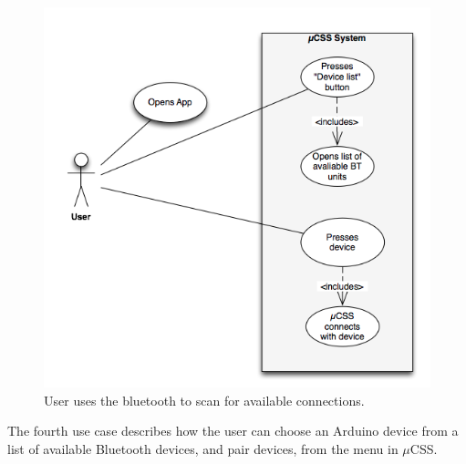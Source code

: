 \begin{figure}[H]
\centering
\includegraphics[scale=0.7]{images/UseCase7}
\caption[Use case 4]{User uses the bluetooth to scan for available connections.}
\end{figure}

The fourth use case describes how the user can choose an Arduino device from a list of available Bluetooth devices, and pair devices, from the menu in $\mu$CSS. 

